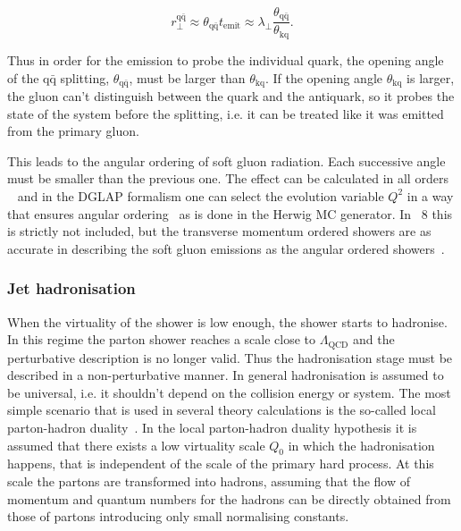 \begin{equation}
r_\perp^{\mathrm{q \bar q}} \approx \theta_\mathrm{q \bar q} t_\mathrm{emit} \approx \lambda_\perp \frac{\theta_\mathrm{q \bar q} }{\theta_\mathrm{k q} }.
\end{equation}

\noindent Thus in order for the emission to probe the individual quark, the opening angle of the $\mathrm{q \bar q}$ splitting, $\theta_\mathrm{q \bar q}$, must be larger than $\theta_\mathrm{k q}$. If the opening angle $\theta_\mathrm{k q}$ is larger, the gluon can't distinguish between the quark and the antiquark, so it probes the state of the system before the splitting, i.e. it can be treated like it was emitted from the primary gluon.  

This leads to the angular ordering of soft gluon radiation. Each successive angle must be smaller than the previous one. The effect can be calculated in all orders ~\cite{missing} and in the DGLAP formalism one can select the evolution variable $Q^2$ in a way that ensures angular ordering~\cite{missing} as is done in the Herwig MC generator. In \pythia~8 this is strictly not included, but the transverse momentum ordered showers are as accurate in describing the soft gluon emissions as the angular ordered showers~\cite{eventGenerators}.




\subsubsection{Jet hadronisation}
When the virtuality of the shower is low enough, the shower starts to hadronise. In this regime the parton shower reaches a scale close to $\Lambda_{\mathrm{QCD}}$ and the perturbative description is no longer valid. Thus the hadronisation stage must be described in a non-perturbative manner. In general hadronisation is assumed to be universal, i.e. it shouldn't depend on the collision energy or system. 
The most simple scenario that is used in several theory calculations is the so-called local parton-hadron duality~\cite{Azimov1985}. In the local parton-hadron duality hypothesis it is assumed that there exists a low virtuality scale $Q_0$ in which the hadronisation happens, that is independent of the scale of the primary hard process. At this scale the partons are transformed into hadrons, assuming that the flow of momentum and quantum numbers for the hadrons can be directly obtained from those of partons introducing only small normalising constants. 

